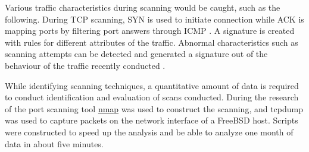 Various traffic characteristics during scanning would be caught, such as the following. During TCP scanning, SYN is used to initiate connection while ACK is mapping ports by filtering port answers through ICMP \autocite{6906328}.
A signature is created with rules for different attributes of the traffic. Abnormal characteristics such as scanning attempts can be detected and generated a signature out of the behaviour of the traffic recently conducted \autocite{6906328}.


While identifying scanning techniques, a quantitative amount of data is required to conduct identification and evaluation of scans conducted. During the research of \textcite{TaxonomyOfNetworkScanning} the port scanning tool \hyperref[s:HowNmapWorks]{nmap} was used to construct the scanning, and tcpdump was used to capture packets on the network interface of a FreeBSD host. Scripts were constructed to speed up the analysis and be able to analyze one month of data in about five minutes. 
